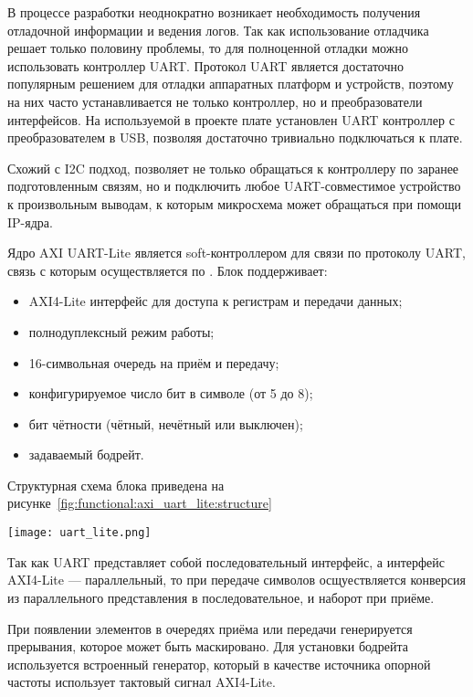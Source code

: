 В процессе разработки неоднократно возникает необходимость получения отладочной
информации и ведения логов. Так как использование отладчика решает только половину
проблемы, то для полноценной отладки можно использовать контроллер UART. Протокол
UART является достаточно популярным решением для отладки аппаратных платформ и устройств,
поэтому на них часто устанавливается не только контроллер, но и преобразователи
интерфейсов. На используемой в проекте плате установлен UART контроллер с преобразователем
в USB, позволяя достаточно тривиально подключаться к плате.

Схожий с I2C подход, позволяет не только обращаться к контроллеру по заранее подготовленным связям, но и
подключить любое UART-совместимое устройство к произвольным выводам, к которым микросхема может обращаться
при помощи IP-ядра.

Ядро AXI UART-Lite является soft-контроллером для связи по протоколу UART, связь с которым осуществляется
по . Блок поддерживает:
\begin{itemize}
  \item AXI4-Lite интерфейс для доступа к регистрам и передачи данных;
  \item полнодуплексный режим работы;
  \item 16-символьная очередь на приём и передачу;
  \item конфигурируемое число бит в символе (от 5 до 8);
  \item бит чётности (чётный, нечётный или выключен);
  \item задаваемый бодрейт.
\end{itemize}

Структурная схема блока приведена на рисунке~\ref{fig:functional:axi_uart_lite:structure}

\begin{center}
  \centering
  \texttt{[image: uart\_lite.png]}
  \label{fig:functional:axi_uart_lite:structure}
\end{center}

Так как UART представляет собой последовательный интерфейс, а интерфейс AXI4-Lite --- параллельный,
то при передаче символов осщуествляется конверсия из параллельного представления в
последовательное, и наборот при приёме.

При появлении элементов в очередях приёма или передачи генерируется прерывания,
которое может быть маскировано. Для установки бодрейта используется встроенный генератор,
который в качестве источника опорной частоты использует тактовый сигнал AXI4-Lite.

